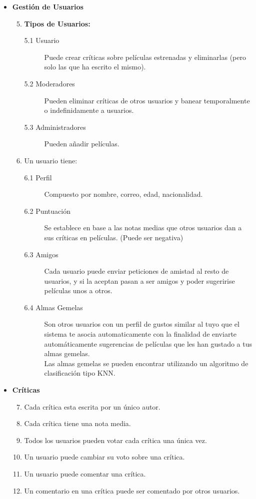\documentclass{article}
\begin{document}
\begin{itemize}
		
	\item \textbf{Gestión de Usuarios}
		\begin{enumerate}[label=\bfseries RF- \arabic*:]
		\setcounter{enumi}{4}
		\item \textbf{Tipos de Usuarios:}
			\begin{description}
				\item[5.1 Usuario] Puede crear críticas sobre películas estrenadas y eliminarlas (pero solo las que ha escrito el mismo).
				\item[5.2 Moderadores] Pueden eliminar críticas de otros usuarios y banear temporalmente o indefinidamente a usuarios.
				\item[5.3 Administradores] Pueden añadir películas.
			\end{description}
		\item Un usuario tiene:
			\begin{description}
				\item[6.1 Perfil] Compuesto por nombre, correo, edad, nacionalidad.
				\item[6.2 Puntuación] Se establece en base a las notas medias que otros usuarios dan a sus críticas en películas. (Puede ser negativa)
				\item[6.3 Amigos] Cada usuario puede enviar peticiones de amistad al resto de usuarios, y si la aceptan pasan a ser amigos y poder sugeririse películas unos a otros.
				\item[6.4 Almas Gemelas] Son otros usuarios con un perfil de gustos similar al tuyo que el sistema te asocia automaticamente con la finalidad de enviarte automáticamente sugerencias de películas que les han gustado a tus almas gemelas.
				\\Las almas gemelas se pueden encontrar utilizando un algoritmo de clasificación tipo KNN.				
			\end{description}
		\end{enumerate}
	
	\item \textbf{Críticas}
		\begin{enumerate}[label=\bfseries RF- \arabic*:]
		\setcounter{enumi}{6}
		\item Cada crítica esta escrita por un único autor.
		\item Cada crítica tiene una nota media.
		\item Todos los usuarios pueden votar cada crítica una única vez.
		\item Un usuario puede cambiar su voto sobre una crítica.
		\item Un usuario puede comentar una crítica.
		\item Un comentario en una crítica puede ser comentado por otros usuarios.
		\end{enumerate}
	\end{itemize}	
	
\end{document}
